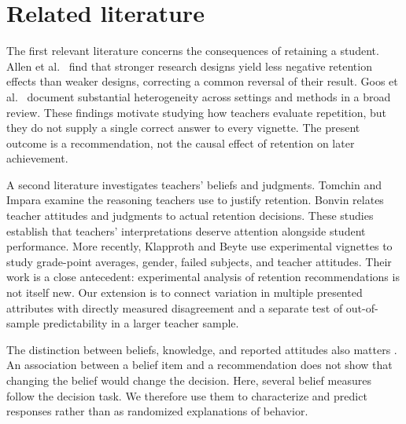 
\section{Related literature}
The first relevant literature concerns the consequences of retaining a student. Allen et al.\ \cite{allen} find that stronger research designs yield less negative retention effects than weaker designs, correcting a common reversal of their result. Goos et al.\ \cite{goos} document substantial heterogeneity across settings and methods in a broad review. These findings motivate studying how teachers evaluate repetition, but they do not supply a single correct answer to every vignette. The present outcome is a recommendation, not the causal effect of retention on later achievement.

A second literature investigates teachers' beliefs and judgments. Tomchin and Impara \cite{tomchin} examine the reasoning teachers use to justify retention. Bonvin \cite{bonvin} relates teacher attitudes and judgments to actual retention decisions. These studies establish that teachers' interpretations deserve attention alongside student performance. More recently, Klapproth and Beyte \cite{klapproth} use experimental vignettes to study grade-point averages, gender, failed subjects, and teacher attitudes. Their work is a close antecedent: experimental analysis of retention recommendations is not itself new. Our extension is to connect variation in multiple presented attributes with directly measured disagreement and a separate test of out-of-sample predictability in a larger teacher sample.

The distinction between beliefs, knowledge, and reported attitudes also matters \cite{pajares}. An association between a belief item and a recommendation does not show that changing the belief would change the decision. Here, several belief measures follow the decision task. We therefore use them to characterize and predict responses rather than as randomized explanations of behavior.

